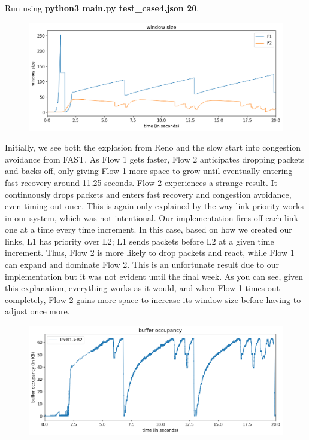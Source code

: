 \documentclass{article}
\begin{document}
Run using \textbf{python3 main.py test\_case4.json 20}.

\begin{figure}[H]
\centering
\includegraphics[width = \textwidth]{test_case4 window size.png}
\end{figure}

Initially, we see both the explosion from Reno and the slow start into congestion avoidance from FAST. As Flow 1 gets faster, Flow 2 anticipates dropping packets and backs off, only giving Flow 1 more space to grow until eventually entering fast recovery around 11.25 seconds. Flow 2 experiences a strange result. It continuously drops packets and enters fast recovery and congestion avoidance, even timing out once. This is again only explained by the way link priority works in our system, which was not intentional. Our implementation fires off each link one at a time every time increment. In this case, based on how we created our links, L1 has priority over L2; L1 sends packets before L2 at a given time increment. Thus, Flow 2 is more likely to drop packets and react, while Flow 1 can expand and dominate Flow 2. This is an unfortunate result due to our implementation but it was not evident until the final week. As you can see, given this explanation, everything works as it would, and when Flow 1 times out completely, Flow 2 gains more space to increase its window size before having to adjust once more.

\begin{figure}[H]
\centering
\includegraphics[width = \textwidth]{test_case4 buffer occupancy.png}
\end{figure}
\end{document}
